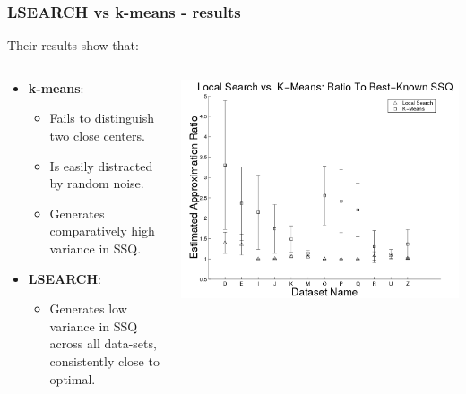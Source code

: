 \documentclass{beamer}
\begin{document}
\frame
{
  \frametitle{LSEARCH vs k-means - results}
  Their results show that:
  \begin{columns}
  
    \begin{column}{0.4\textwidth}
    	  \begin{itemize}
    	  	\item[]{\textbf{k-means}:
    	  	  \begin{itemize}
    	  	    \item{Fails to distinguish two close centers.}
    	  	    \item{Is easily distracted by random noise.}
    	  	    \item{Generates comparatively high variance in SSQ.}
    	  	  \end{itemize}
    	  	}
    	  	\item[]{\textbf{LSEARCH}:
    	  	  \begin{itemize}
    	  	    \item{Generates low variance in SSQ across all data-sets, consistently close to optimal.}
    	  	  \end{itemize}
    	  	}
    	  \end{itemize}
    	  
    \end{column}
    
    \begin{column}{0.6\textwidth}
        \begin{center}
         \includegraphics[width=\textwidth]{figures/LSEARCH_vs_k-means.png}      
        \end{center}
    \end{column}
    
  \end{columns}  
}
\end{document}
